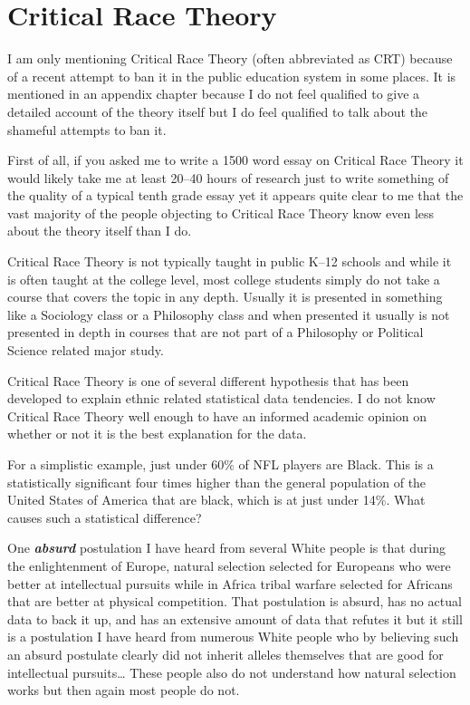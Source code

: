 \section{Critical Race Theory}

I am only mentioning Critical Race Theory (often abbreviated as CRT) because of a recent attempt to ban it in the public education system in some places. It is mentioned in an appendix chapter because I do not feel qualified to give a detailed account of the theory itself but I do feel qualified to talk about the shameful attempts to ban it.

First of all, if you asked me to write a 1500 word essay on Critical Race Theory it would likely take me at least 20--40 hours of research just to write something of the quality of a typical tenth grade essay yet it appears quite clear to me that the vast majority of the people objecting to Critical Race Theory know even less about the theory itself than I do.

Critical Race Theory is not typically taught in public K--12 schools and while it is often taught at the college level, most college students simply do not take a course that covers the topic in any depth. Usually it is presented in something like a Sociology class or a Philosophy class and when presented it usually is not presented in depth in courses that are not part of a Philosophy or Political Science related major study.

Critical Race Theory is one of several different hypothesis that has been developed to explain ethnic related statistical data tendencies. I do not know Critical Race Theory well enough to have an informed academic opinion on whether or not it is the best explanation for the data.

For a simplistic example, just under 60\% of NFL players are Black. This is a statistically significant four times higher than the general population of the United States of America that are black, which is at just under 14\%. What causes such a statistical difference?

One \textbf{\emph{absurd}} postulation I have heard from several White people is that during the enlightenment of Europe, natural selection selected for Europeans who were better at intellectual pursuits while in Africa tribal warfare selected for Africans that are better at physical competition. That postulation is absurd, has no actual data to back it up, and has an extensive amount of data that refutes it but it still is a postulation I have heard from numerous White people who by believing such an absurd postulate clearly did not inherit alleles themselves that are good for intellectual pursuits\ldots{} These people also do not understand how natural selection works but then again most people do not.

